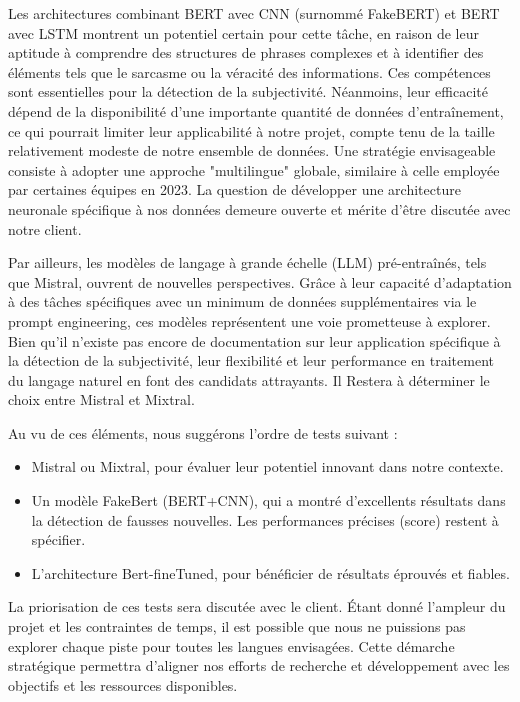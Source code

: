 \documentclass[11pt]{rapport_class}
\begin{document}
Les architectures combinant BERT avec CNN (surnommé FakeBERT) et BERT avec LSTM montrent un potentiel certain pour cette tâche, en raison de leur aptitude à comprendre des structures de phrases complexes et à identifier des éléments tels que le sarcasme ou la véracité des informations. Ces compétences sont essentielles pour la détection de la subjectivité. Néanmoins, leur efficacité dépend de la disponibilité d'une importante quantité de données d'entraînement, ce qui pourrait limiter leur applicabilité à notre projet, compte tenu de la taille relativement modeste de notre ensemble de données. Une stratégie envisageable consiste à adopter une approche "multilingue" globale, similaire à celle employée par certaines équipes en 2023. La question de développer une architecture neuronale spécifique à nos données demeure ouverte et mérite d'être discutée avec notre client.

Par ailleurs, les modèles de langage à grande échelle (LLM) pré-entraînés, tels que Mistral, ouvrent de nouvelles perspectives. Grâce à leur capacité d'adaptation à des tâches spécifiques avec un minimum de données supplémentaires via le prompt engineering, ces modèles représentent une voie prometteuse à explorer. Bien qu'il n'existe pas encore de documentation sur leur application spécifique à la détection de la subjectivité, leur flexibilité et leur performance en traitement du langage naturel en font des candidats attrayants. Il Restera à déterminer le choix entre Mistral et Mixtral.

Au vu de ces éléments, nous suggérons l'ordre de tests suivant :
\begin{itemize}
    \item  Mistral ou Mixtral, pour évaluer leur potentiel innovant dans notre contexte.
    \item  Un modèle FakeBert (BERT+CNN), qui a montré d'excellents résultats dans la détection de fausses nouvelles. Les performances précises (score) restent à spécifier.
    \item L'architecture Bert-fineTuned, pour bénéficier de résultats éprouvés et fiables.
\end{itemize}

La priorisation de ces tests sera discutée avec le client. Étant donné l'ampleur du projet et les contraintes de temps, il est possible que nous ne puissions pas explorer chaque piste pour toutes les langues envisagées. Cette démarche stratégique permettra d'aligner nos efforts de recherche et développement avec les objectifs et les ressources disponibles.
\end{document}
